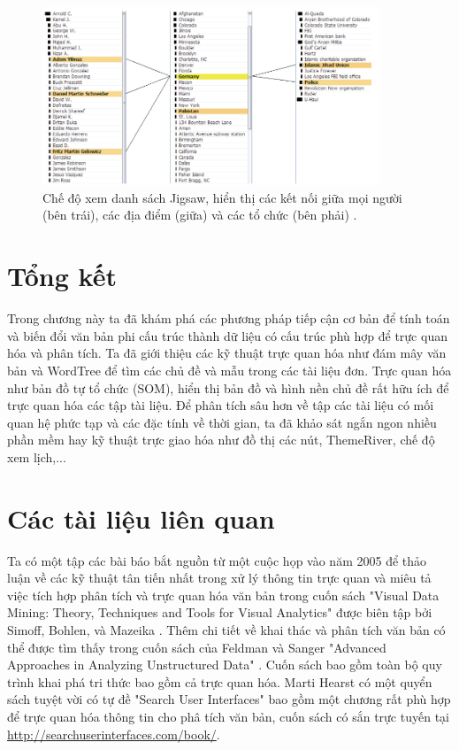 \documentclass[14pt, a4paper]{article}
\numberwithin{equation}{section}
\numberwithin{figure}{section}
\numberwithin{dl}{section}
\numberwithin{md}{section}
\numberwithin{bd}{section}
\numberwithin{dn}{section}
\numberwithin{hq}{section}
\begin{document}
    \begin{figure}[h!]
        \centering
        \includegraphics[width=0.9\textwidth]{20.png}
        \caption{Chế độ xem danh sách Jigsaw, hiển thị các kết nối giữa mọi người (bên trái), các địa điểm (giữa) và các tổ chức (bên phải) \cite{155}.}
        \label{fig:20}
    \end{figure}

    \section{Tổng kết}

    Trong chương này ta đã khám phá các phương pháp tiếp cận cơ bản để tính toán và biến đổi văn bản phi cấu trúc thành dữ liệu có cấu trúc phù hợp để trực quan hóa và phân tích.
    Ta đã giới thiệu các kỹ thuật trực quan hóa như đám mây văn bản và WordTree để tìm các chủ đề và mẫu trong các tài liệu đơn.
    Trực quan hóa như bản đồ tự tổ chức (SOM), hiển thị bản đồ và hình nền chủ đề rất hữu ích để trực quan hóa các tập tài liệu.
    Để phân tích sâu hơn về tập các tài liệu có mối quan hệ phức tạp và các đặc tính về thời gian, ta đã khảo sát ngắn ngon nhiều phần mềm hay kỹ thuật trực giao hóa như đồ thị các nút, ThemeRiver, chế độ xem lịch,...

    \section{Các tài liệu liên quan}

    Ta có một tập các bài báo bắt nguồn từ một cuộc họp vào năm 2005 để thảo luận về các kỹ thuật tân tiến nhất trong xử lý thông tin trực quan và miêu tả việc tích hợp phân tích và trực quan hóa văn bản trong cuốn sách "Visual Data Mining: Theory, Techniques and Tools for Visual Analytics" được biên tập bởi Simoff, Bohlen, và Mazeika \cite{379}.
    Thêm chi tiết về khai thác và phân tích văn bản có thể được tìm thấy trong cuốn sách của Feldman và Sanger "Advanced Approaches in Analyzing Unstructured Data" \cite{122}.
    Cuốn sách bao gồm toàn bộ quy trình khai phá tri thức bao gồm cả trực quan hóa.
    Marti Hearst có một quyển sách tuyệt vời có tự đề "Search User Interfaces" \cite{179} bao gồm một chương rất phù hợp để trực quan hóa thông tin cho phâ tích văn bản, cuốn sách có sắn trực tuyến tại \url{http://searchuserinterfaces.com/book/}.
    
    \newpage
    
    \printbibliography[title={TÀI LIỆU THAM KHẢO}]
\end{document}
